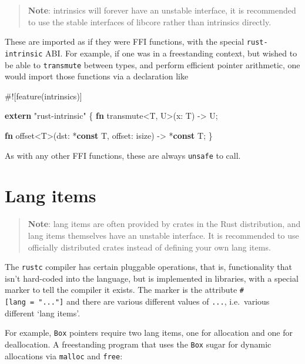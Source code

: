 \documentclass[a4paper,]{book}
\newenvironment{Shaded}{\begin{snugshade}}{\end{snugshade}}
\newcommand{\KeywordTok}[1]{\textcolor[rgb]{0.13,0.29,0.53}{\textbf{{#1}}}}
\newcommand{\DataTypeTok}[1]{\textcolor[rgb]{0.13,0.29,0.53}{{#1}}}
\newcommand{\StringTok}[1]{\textcolor[rgb]{0.31,0.60,0.02}{{#1}}}
\newcommand{\AttributeTok}[1]{\textcolor[rgb]{0.77,0.63,0.00}{{#1}}}
\newcommand{\NormalTok}[1]{{#1}}
\begin{document}
\begin{quote}
\textbf{Note}: intrinsics will forever have an unstable interface, it is
recommended to use the stable interfaces of libcore rather than
intrinsics directly.
\end{quote}

These are imported as if they were FFI functions, with the special
\texttt{rust-intrinsic} ABI. For example, if one was in a freestanding
context, but wished to be able to \texttt{transmute} between types, and
perform efficient pointer arithmetic, one would import those functions
via a declaration like

\begin{Shaded}
\begin{Highlighting}[]
\AttributeTok{#![}\NormalTok{feature}\AttributeTok{(}\NormalTok{intrinsics}\AttributeTok{)]}

\KeywordTok{extern} \StringTok{"rust-intrinsic"} \NormalTok{\{}
    \KeywordTok{fn} \NormalTok{transmute<T, U>(x: T) -> U;}

    \KeywordTok{fn} \NormalTok{offset<T>(dst: *}\KeywordTok{const} \NormalTok{T, offset: }\DataTypeTok{isize}\NormalTok{) -> *}\KeywordTok{const} \NormalTok{T;}
\NormalTok{\}}
\end{Highlighting}
\end{Shaded}

As with any other FFI functions, these are always \texttt{unsafe} to
call.

\section{Lang items}\label{sec--lang-items}

\begin{quote}
\textbf{Note}: lang items are often provided by crates in the Rust
distribution, and lang items themselves have an unstable interface. It
is recommended to use officially distributed crates instead of defining
your own lang items.
\end{quote}

The \texttt{rustc} compiler has certain pluggable operations, that is,
functionality that isn't hard-coded into the language, but is
implemented in libraries, with a special marker to tell the compiler it
exists. The marker is the attribute \texttt{\#{[}lang\ =\ "..."{]}} and
there are various different values of \texttt{...}, i.e.~various
different `lang items'.

For example, \texttt{Box} pointers require two lang items, one for
allocation and one for deallocation. A freestanding program that uses
the \texttt{Box} sugar for dynamic allocations via \texttt{malloc} and
\texttt{free}:
\end{document}
